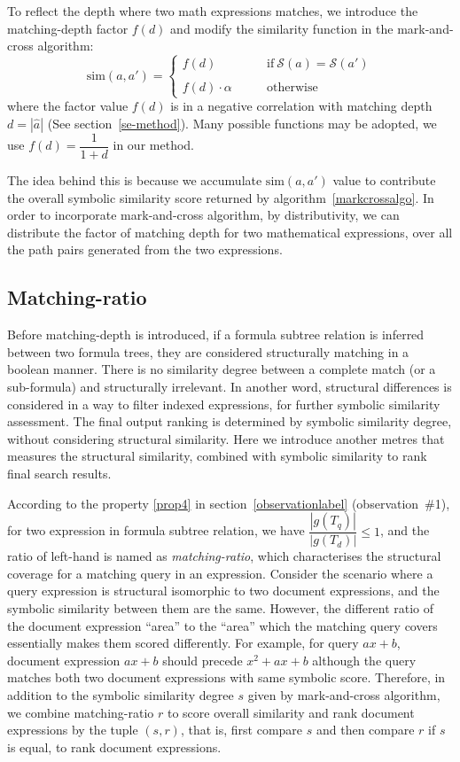 To reflect the depth where two math expressions matches, we introduce the matching-depth factor $f(d)$ and modify the similarity function in the mark-and-cross algorithm:
$$
\mathrm{sim}(a,a') = 
\left\{
\begin{array}{ll}
f(d)   &\qquad \mathrm{if}\  \mathcal{S}(a) = \mathcal{S}(a')
\\
\\
f(d) \cdot \alpha  &\qquad \mathrm{otherwise}
\end{array}
\right.
$$
where the factor value $f(d)$ is in a negative correlation with matching depth $d = |\hat{a}|$ (See section~\ref{se-method}). 
Many possible functions may be adopted, we use $f(d) = \dfrac{1}{1 + d}$ in our method. 

The idea behind this is because we accumulate $\mathrm{sim}(a,a')$ value to contribute the overall symbolic similarity score returned by algorithm~\ref{markcrossalgo}. In order to incorporate mark-and-cross algorithm, by distributivity, we can distribute the factor of matching depth for two mathematical expressions, over all the path pairs generated from the two expressions. 

\subsection{Matching-ratio}
Before matching-depth is introduced, if a formula subtree relation is inferred between two formula trees, they are considered structurally matching in a boolean manner. 
There is no similarity degree between a complete match (or a sub-formula) and structurally irrelevant. 
In another word, structural differences is considered in a way to filter indexed expressions, for further symbolic similarity assessment. 
The final output ranking is determined by symbolic similarity degree, without considering structural similarity. 
Here we introduce another metres that measures the structural similarity, combined with symbolic similarity to rank final search results.

According to the property \ref{prop4} in section~\ref{observationlabel} (observation~\#1), for two expression in formula subtree relation, we have $\dfrac{|g(T_q)|}{|g(T_d)|} \le 1$, and the ratio of left-hand is named as \textit{matching-ratio}, which characterises the structural coverage for a matching query in an expression.
Consider the scenario where a query expression is structural isomorphic to two document expressions, and the symbolic similarity between them are the same. 
However, the different ratio of the document expression ``area'' to the ``area'' which the matching query covers essentially makes them scored differently.
For example, for query $ax + b$, document expression $ax + b$ should precede $x^2 + ax + b$ although the query matches both two document expressions with same symbolic score.
Therefore, in addition to the symbolic similarity degree $s$ given by mark-and-cross algorithm, we combine matching-ratio $r$ to score overall similarity and rank document expressions by the tuple $(s, r)$, that is, first compare $s$ and then compare $r$ if $s$ is equal, to rank document expressions.



